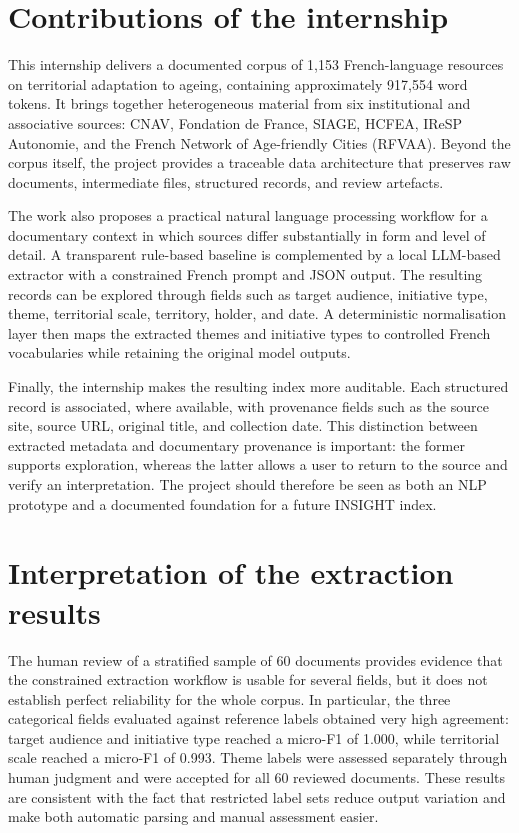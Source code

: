 \documentclass[
11pt,
english,
singlespacing,
headsepline,
]{MastersDoctoralThesis}
\begin{document}
\section{Contributions of the internship}

This internship delivers a documented corpus of 1,153 French-language
resources on territorial adaptation to ageing, containing approximately
917,554 word tokens. It brings together heterogeneous material from six
institutional and associative sources: CNAV, Fondation de France, SIAGE,
HCFEA, IReSP Autonomie, and the French Network of Age-friendly Cities
(RFVAA). Beyond the corpus itself, the project provides a traceable data
architecture that preserves raw documents, intermediate files, structured
records, and review artefacts.

The work also proposes a practical natural language processing workflow for a
documentary context in which sources differ substantially in form and level of
detail. A transparent rule-based baseline is complemented by a local LLM-based
extractor with a constrained French prompt and JSON output. The resulting
records can be explored through fields such as target audience, initiative
type, theme, territorial scale, territory, holder, and date. A deterministic
normalisation layer then maps the extracted themes and initiative types to
controlled French vocabularies while retaining the original model outputs.

Finally, the internship makes the resulting index more auditable. Each
structured record is associated, where available, with provenance fields such
as the source site, source URL, original title, and collection date. This
distinction between extracted metadata and documentary provenance is important:
the former supports exploration, whereas the latter allows a user to return to
the source and verify an interpretation. The project should therefore be seen
as both an NLP prototype and a documented foundation for a future INSIGHT
index.

\section{Interpretation of the extraction results}

The human review of a stratified sample of 60 documents provides evidence that
the constrained extraction workflow is usable for several fields, but it does
not establish perfect reliability for the whole corpus. In particular, the
three categorical fields evaluated against reference labels obtained very high
agreement: target audience and initiative type reached a micro-F1 of 1.000,
while territorial scale reached a micro-F1 of 0.993. Theme labels were assessed
separately through human judgment and were accepted for all 60 reviewed
documents. These results are consistent with the fact that restricted label
sets reduce output variation and make both automatic parsing and manual
assessment easier.
\end{document}
